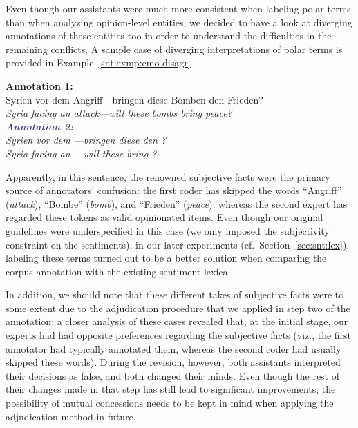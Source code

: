 Even though our assistants were much more consistent when labeling
polar terms than when analyzing opinion-level entities, we
decided to have a look at diverging annotations of these entities too
in order to understand the difficulties in the remaining conflicts.  A
sample case of diverging interpretations of polar terms is provided in
Example~\ref{snt:exmp:emo-disagr}

\begin{example}\label{snt:exmp:emo-disagr}
  \textcolor{red3}{\textbf{Annotation 1:}}\\ \upshape{}Syrien vor dem
  Angriff---bringen diese Bomben den Frieden?\\[0.3em]\itshape
  \noindent\itshape{}Syria facing an attack---will these bombs bring
  peace?\\

  \noindent\textcolor{darkslateblue}{\textbf{\itshape Annotation
      2:}}\\ \upshape{}Syrien vor dem
  \emoexpression{\textcolor{red}{Angriff}}---bringen diese
  \emoexpression{\textcolor{red}{Bomben}} den
  \emoexpression{\textcolor{red}{Frieden}}?\\[0.3em]
  \noindent\itshape{}Syria facing an
  \upshape{}\itshape{}---will
  these
  \upshape{}\itshape{}
  bring
  \upshape{}\itshape{}?
\end{example}

Apparently, in this sentence, the renowned subjective facts were the
primary source of annotators' confusion: the first coder has skipped
the words ``Angriff'' (\emph{attack}), ``Bombe'' (\emph{bomb}), and
``Frieden'' (\emph{peace}), whereas the second expert has regarded
these tokens as valid opinionated items.  Even though our original
guidelines were underspecified in this case (we only imposed the
subjectivity constraint on the sentiments), in our later experiments
(cf.~Section~\ref{sec:snt:lex}), labeling these terms turned out to be
a better solution when comparing the corpus annotation with the
existing sentiment lexica.

In addition, we should note that these different takes of subjective
facts were to some extent due to the adjudication procedure that we
applied in step two of the annotation: a closer analysis of these
cases revealed that, at the initial stage, our experts had had
opposite preferences regarding the subjective facts (viz., the first
annotator had typically annotated them, whereas the second coder had
usually skipped these words).  During the revision, however, both
assistants interpreted their decisions as false, and both changed
their minds.  Even though the rest of their changes made in that step
has still lead to significant improvements, the possibility of mutual
concessions needs to be kept in mind when applying the adjudication
method in future.

